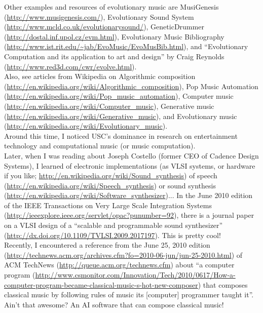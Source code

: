 Other examples and resources of evolutionary music are MusiGenesis (\url{http://www.musigenesis.com/}), Evolutionary Sound System (\url{http://www.mcld.co.uk/evolutionarysound/}), GeneticDrummer (\url{http://dostal.inf.upol.cz/evm.html}), Evolutionary Music Bibliography (\url{http://www.ist.rit.edu/~jab/EvoMusic/EvoMusBib.html}), and ``Evolutionary Computation and its application to art and design'' by Craig Reynolds (\url{http://www.red3d.com/cwr/evolve.html}). \\
 
 
 
Also, see articles from Wikipedia on Algorithmic composition (\url{http://en.wikipedia.org/wiki/Algorithmic_composition}), Pop Music Automation (\url{http://en.wikipedia.org/wiki/Pop_music_automation}), Computer music (\url{http://en.wikipedia.org/wiki/Computer_music}), Generative music (\url{http://en.wikipedia.org/wiki/Generative_music}), and Evolutionary music (\url{http://en.wikipedia.org/wiki/Evolutionary_music}). \\
 
 
 
Around this time, I noticed USC's dominance in research on entertainment technology and computational music (or music computation). \\
 
Later, when I was reading about Joseph Costello (former CEO of Cadence Design Systems), I learned of electronic implementations (as VLSI systems, or hardware if you like; \url{http://en.wikipedia.org/wiki/Sound_synthesis}) of speech (\url{http://en.wikipedia.org/wiki/Speech_synthesis}) or sound synthesis (\url{http://en.wikipedia.org/wiki/Software_synthesizer})... In the June 2010 edition of the IEEE Transactions on Very Large Scale Integration Systems (\url{http://ieeexplore.ieee.org/servlet/opac?punumber=92}), there is a journal paper on a VLSI design of a ``scalable and programmable sound synthesizer'' (\url{http://dx.doi.org/10.1109/TVLSI.2009.2017197}). This is pretty cool! \\
 
Recently, I encountered a reference from the June 25, 2010 edition (\url{http://technews.acm.org/archives.cfm?fo=2010-06-jun/jun-25-2010.html}) of ACM TechNews (\url{http://queue.acm.org/technews.cfm}) about ``a computer program (\url{http://www.csmonitor.com/Innovation/Tech/2010/0617/How-a-computer-program-became-classical-music-s-hot-new-composer}) that composes classical music by following rules of music its [computer] programmer taught it''. Ain't that awesome? An AI software that can compose classical music! \\
 
